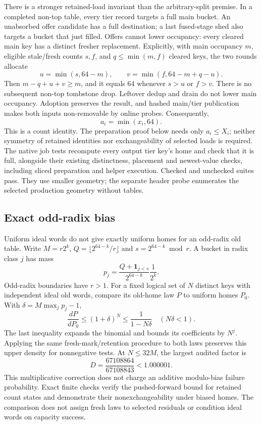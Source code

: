 \documentclass[11pt]{article}
\theoremstyle{definition}
\theoremstyle{remark}
\newcommand{\ind}{\mathbf 1}
\begin{document}
There is a stronger retained-load invariant than the arbitrary-split premise.
In a completed non-top table, every tier record targets a full main bucket.
An unabsorbed offer candidate has a full destination; a last fused-stage
shed also targets a bucket that just filled. Offers cannot lower occupancy:
every cleared main key has a distinct fresher replacement. Explicitly, with
main occupancy $m$, eligible stale/fresh counts $s,f$, and $q\le\min(m,f)$
cleared keys, the two rounds allocate
\[
 u=\min(s,64-m),\qquad v=\min(f,64-m+q-u).
\]
Then $m-q+u+v\ge m$, and it equals 64 whenever $s>u$ or $f>v$.
There is no subsequent non-top tombstone drop. Leftover dedup and drain
do not lower main occupancy. Adoption preserves the result, and
hashed main/tier publication makes both inputs non-removable by online
probes. Consequently,
\[
 a_i=\min(x_i,64).
\]
This is a count identity. The preparation proof below needs only
$a_i\le X_i$; neither symmetry of retained identities nor exchangeability
of selected loads is required.
The native job tests recompute every output tier key's home and check
that it is full, alongside their existing distinctness, placement and
newest-value checks, including sliced preparation and helper execution.
Checked and unchecked suites pass. They use smaller geometry; the separate
header probe enumerates the selected production geometry without tables.

\subsection{Exact odd-radix bias}
Uniform ideal words do not give exactly uniform homes for an odd-radix
old table. Write $M=r2^k$, $Q=\lfloor2^{64-k}/r\rfloor$ and
$s=2^{64-k}\bmod r$. A bucket in radix class $j$ has mass
\[
 p_j=\frac{Q+\ind_{j<s}}{2^{64-k}}\frac1{2^k}.
\]
Odd-radix boundaries have $r>1$. For a fixed logical set
of $N$ distinct keys with independent ideal old words, compare its old-home
law $P$ to uniform homes $P_0$. With $\delta=M\max_j p_j-1$,
\[
 \frac{dP}{dP_0}\le(1+\delta)^N\le\frac1{1-N\delta}\quad(N\delta<1).
\]
The last inequality expands the binomial and bounds its coefficients by
$N^j$. Applying the same fresh-mark/retention procedure to both laws
preserves this upper density for nonnegative tests. At $N\le32M$, the
largest audited factor is
\[
 D=\frac{67108864}{67108843}<1.000001.
\]
This multiplicative correction does not charge an additive modulo-bias
failure probability. Exact finite checks verify the pushed-forward bound
for retained count states and demonstrate their nonexchangeability under
biased homes. The comparison does not assign fresh laws to selected
residuals or condition ideal words on capacity success.
\end{document}
